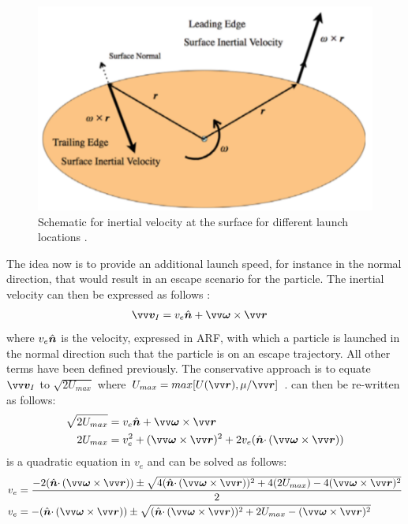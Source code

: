 \begin{figure}[htb]
\centering
\captionsetup{justification=centering}
\includegraphics[width=\textwidth, height=0.3\textheight, keepaspectratio=true]{leading_trailing_edge.pdf}
\caption{Schematic for inertial velocity at the surface for different launch locations \parencite{scheeresBook}.}
\label{fig:conservative_escape_speed_leading_trailing_edges}
\end{figure}
\FloatBarrier
The idea now is to provide an additional launch speed, for instance in the normal direction, that would result in an escape scenario for the particle. The inertial velocity can then be expressed as follows \parencite{scheeresBook}:
\begin{align}
    \bv{v}_I &= v_{e}\buv{n} + \bv{\omega} \times \bv{r}
    \label{eqn:conservative_inertial_escape}
\end{align}
where $v_e\hat{\bm{n}}$ is the velocity, expressed in \gls{ARF}, with which a particle is launched in the normal direction such that the particle is on an escape trajectory. All other terms have been defined previously. The conservative approach is to equate $\bv{v}_I$ to $\sqrt{2U_{max}}$ where $U_{max} = max[U(\bv{r}), \mu/\bv{r}]$ \parencite{scheeresBook}.  can then be re-written as follows:
\begin{align}
    \sqrt{2U_{max}} &= v_{e}\buv{n} + \bv{\omega} \times \bv{r} \\
    2U_{max} &= v_e^2 + (\bv{\omega} \times \bv{r})^2 + 2 v_e (\buv{n} \cdotp (\bv{\omega} \times \bv{r}))
    \label{eqn:conservative_quadratic}
\end{align}
 is a quadratic equation in $v_e$ and can be solved as follows:
\begin{align}
    v_e &= \frac{-2(\buv{n} \cdotp (\bv{\omega} \times \bv{r})) \pm \sqrt{4 (\buv{n} \cdotp (\bv{\omega} \times \bv{r}))^2 + 4 (2U_{max}) - 4(\bv{\omega} \times \bv{r})^2}}{2} \\
    v_e &= -(\buv{n} \cdotp (\bv{\omega} \times \bv{r})) \pm \sqrt{(\buv{n} \cdotp (\bv{\omega} \times \bv{r}))^2 + 2U_{max} - (\bv{\omega} \times {\bv{r}})^2}
\end{align}
